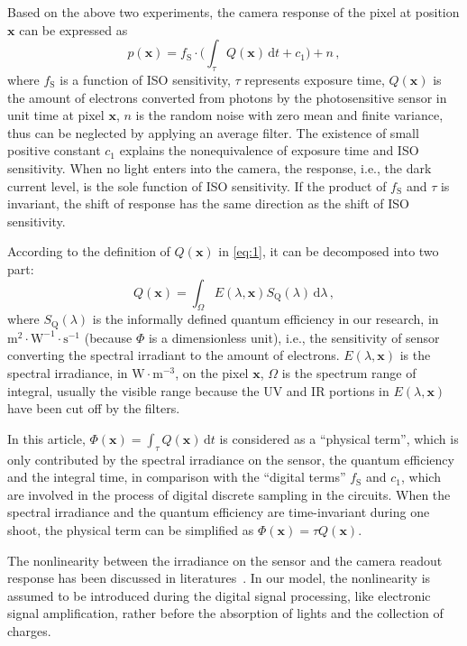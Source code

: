 \documentclass[9pt,twocolumn,twoside]{osajnl}
\newcommand{\D}{\mathrm{d}}
\begin{document}
Based on the above two experiments, the camera response of the pixel at position $\mathbf{x}$ can be expressed as
\begin{equation}
p(\mathbf{x}) = f_\text{S}\cdot\Big(\int_\tau Q(\mathbf{x})\,\D{t}+c_1\Big)+n\,,
\label{eq:1}
\end{equation}
where $f_\text{S}$ is a function of ISO sensitivity, $\tau$ represents exposure time, $Q(\textbf{x})$ is the amount of electrons converted from photons by the photosensitive sensor in unit time at pixel $\textbf{x}$, $n$ is the random noise with zero mean and finite variance, thus can be neglected by applying an average filter. The existence of small positive constant $c_1$ explains the nonequivalence of exposure time and ISO sensitivity. When no light enters into the camera, the response, i.e., the dark current level, is the sole function of ISO sensitivity. If the product of $f_\text{S}$ and $\tau$ is invariant, the shift of response has the same direction as the shift of ISO sensitivity.

According to the definition of $Q(\mathbf{x})$ in \eqref{eq:1}, it can be decomposed into two part:
\begin{equation}
Q(\mathbf{x}) = \int_\Omega{}E(\lambda,\mathbf{x})S_\text{Q}(\lambda)\,\D{\lambda}\,,
\label{eq:2}
\end{equation}
where $S_\text{Q}(\lambda)$ is the informally defined quantum efficiency in our research, in $\text{m}^2\cdot\text{W}^{-1}\cdot\text{s}^{-1}$ (because $\Phi$ is a dimensionless unit), i.e., the sensitivity of sensor converting the spectral irradiant to the amount of electrons. $E(\lambda,\mathbf{x})$ is the spectral irradiance, in $\text{W}\cdot\text{m}^{-3}$, on the pixel $\mathbf{x}$, $\Omega$ is the spectrum range of integral, usually the visible range because the UV and IR portions in $E(\lambda,\mathbf{x})$ have been cut off by the filters.

In this article, $\Phi(\mathbf{x}) = \int_\tau Q(\mathbf{x})\,\D{t}$ is considered as a ``physical term'', which is only contributed by the spectral irradiance on the sensor, the quantum efficiency and the integral time, in comparison with the ``digital terms'' $f_\text{S}$ and $c_1$, which are involved in the process of digital discrete sampling in the circuits. When the spectral irradiance and the quantum efficiency are time-invariant during one shoot, the physical term can be simplified as $\Phi(\mathbf{x})=\tau Q(\mathbf{x})$.

The nonlinearity between the irradiance on the sensor and the camera readout response has been discussed in literatures~\cite{Barnard:02,Fiorentin:05,Thomson:01}. In our model, the nonlinearity is assumed to be introduced during the digital signal processing, like electronic signal amplification, rather before the absorption of lights and the collection of charges.
\end{document}
